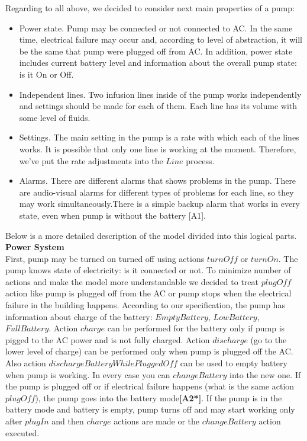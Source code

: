 \documentclass{article}
\begin{document}
Regarding to all above, we decided to consider next main properties of a pump: \\
\begin{itemize}
\item Power state. Pump may be connected or not connected to AC. In the same time, electrical failure may occur and, according to level of abstraction, it will be the same that pump were plugged off from AC. In addition, power state includes current battery level and information about the overall pump state: is it On or Off.
\item Independent lines. Two infusion lines inside of the pump works independently and settings should be made for each of them. Each line has its volume with some level of fluids. 
\item Settings. The main setting in the pump is a rate with which each of the lines works. It is possible that only one line is working at the moment. Therefore, we’ve put the rate adjustments into the $Line$ process.
\item Alarms. There are different alarms that shows problems in the pump. There are audio-visual alarms for different types of problems for each line, so they may work simultaneously.There is a simple backup alarm that works in every state, even when pump is without the battery [A1].
\end{itemize}
Below is a more detailed description of the model divided into this logical parts.\\

\textbf{Power System} \\

First, pump may be turned on turned off using actions $turnOff$ or $turnOn$. The pump knows state of electricity: is it connected or not. To minimize number of actions and make the model more understandable we decided to treat $plugOff$ action like pump is plugged off from the AC or pump stops when the electrical failure in the building happens.
According to our specification, the pump has information about charge of the battery: $EmptyBattery$, $LowBattery$, $FullBattery$. Action $charge$ can be performed for the battery only if pump is pigged to the AC power and is not fully charged. Action $discharge$ (go to the lower level of charge) can be performed only when pump is plugged off the AC. Also action $dischargeBatteryWhilePluggedOff$ can be used to empty battery when pump is working. In every case you can $changeBattery$ into the new one.
If the pump is plugged off or if electrical failure happens (what is the same action $plugOff$), the pump goes into the battery mode\textbf{[A2*]}.
If the pump is in the battery mode and battery is empty, pump turns off and may start working only after $plugIn$ and then $charge$ actions are made or the $changeBattery$ action executed.\\
\end{document}
